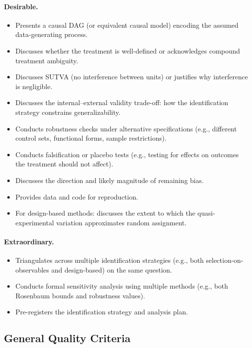 \paragraph{Desirable.}
\begin{itemize}[leftmargin=15pt]
    \item Presents a causal DAG (or equivalent causal model) encoding the assumed data-generating process.
    \item Discusses whether the treatment is well-defined or acknowledges compound treatment ambiguity.
    \item Discusses SUTVA (no interference between units) or justifies why interference is negligible.
    \item Discusses the internal--external validity trade-off: how the identification strategy constrains generalizability.
    \item Conducts robustness checks under alternative specifications (e.g., different control sets, functional forms, sample restrictions).
    \item Conducts falsification or placebo tests (e.g., testing for effects on outcomes the treatment should not affect).
    \item Discusses the direction and likely magnitude of remaining bias.
    \item Provides data and code for reproduction.
    \item For design-based methods: discusses the extent to which the quasi-experimental variation approximates random assignment.
\end{itemize}

\paragraph{Extraordinary.}
\begin{itemize}[leftmargin=15pt]
    \item Triangulates across multiple identification strategies (e.g., both selection-on-observables and design-based) on the same question.
    \item Conducts formal sensitivity analysis using multiple methods (e.g., both Rosenbaum bounds and robustness values).
    \item Pre-registers the identification strategy and analysis plan.
\end{itemize}

\subsection{General Quality Criteria}

